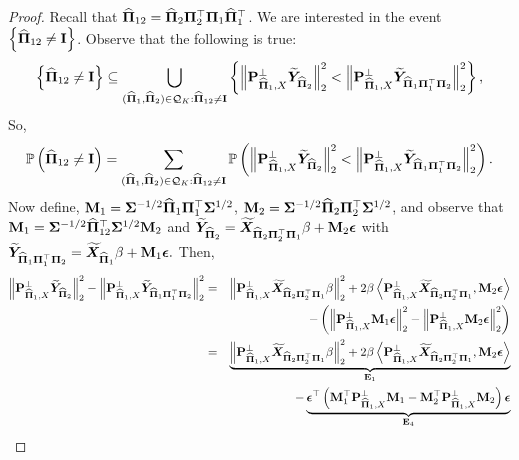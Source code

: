 \documentclass[numsec,webpdf,modern,medium,namedate]{oup-authoring-template}
\theoremstyle{thmstyleone}%
\theoremstyle{thmstyletwo}%
\theoremstyle{thmstylethree}%
\begin{document}
\begin{proof}
Recall that $\hatPi_{12} = \hatPi_2 \bPi_2^\top \bPi_1 \hatPi_1^\top$. We are interested in the event $\left\{\hatPi_{12} \ne \bI\right\}$. Observe that the following is true:
\begin{equation}
\label{eq:selection}
\left\{\hatPi_{12} \ne \bI\right\} \subseteq \underset{(\hatPi_1, \hatPi_2) \in \calQ_K:\hatPi_{12}\neq \bI}{\bigcup}\left\{\left\| \bP_{\hatPi_1, X}^\perp \widetilde{\bY}_{{\hatPi_2}}\right\|_2^2 
<
\left\| \bP_{\hatPi_1, X}^\perp \tilY_{\hatPi_1 \bPi_1^\top \bPi_2} \right\|_2^2\right\},
\end{equation}
So, $$\Prob\left(\hatPi_{12} \ne \bI\right) = \sum_{(\hatPi_1, \hatPi_2) \in \calQ_K:\hatPi_{12}\neq \bI} \Prob\left(\left\| \bP_{\hatPi_1, X}^\perp \tilY_{{\hatPi_2}}\right\|_2^2 
< \left\| \bP_{\hatPi_1, X}^\perp \tilY_{\hatPi_1 \bPi_1^\top \bPi_2} \right\|_2^2\right).$$
Now define, $\bM_1 = \bSigma^{-1/2}\hatPi_1 \bPi_1^\top \bSigma^{1/2}$,  $\bM_2 = \bSigma^{-1/2}\hatPi_2 \bPi_2^\top \bSigma^{1/2}$, and observe that $\bM_1 =\bSigma^{-1/2} \hatPi_{12}^\top \bSigma^{1/2} \bM_2$ and $\tilY_{\hatPi_2} = \tilX_{\hatPi_2\bPi_2^\top \bPi_1} \beta + \bM_2 \beps$ with $\tilY_{\hatPi_1 \bPi_1^\top \bPi_2} = \tilX_{\hatPi_1} \beta + \bM_1 \beps.$
Then, 
{\footnotesize
\begin{eqnarray*}
\left\| \bP_{\hatPi_1, X}^\perp \tilY_{\hatPi_2}\right\|_2^2 -
\left\| \bP_{\hatPi_1, X}^\perp \tilY_{\hatPi_1 \bPi_1^\top \bPi_2} \right\|_2^2 & = &\norm{\bP_{\hatPi_1, X}^\perp \tilX_{\hatPi_2\bPi_2^\top \bPi_1} \beta}_2^2 + 2 \beta \left\langle \bP_{\hatPi_1, X}^\perp \tilX_{\hatPi_2\bPi_2^\top \bPi_1} , \bM_2 \beps\right\rangle \\
&& -\left(\norm{ \bP_{\hatPi_1, X}^\perp \bM_1 \beps}_2^2 - \norm{ \bP_{\hatPi_1, X}^\perp \bM_2 \beps}_2^2\right) \\
& = &\underbrace{\norm{\bP_{\hatPi_1, X}^\perp \tilX_{\hatPi_2\bPi_2^\top \bPi_1} \beta}_2^2 + 2 \beta \left\langle \bP_{\hatPi_1, X}^\perp \tilX_{\hatPi_2\bPi_2^\top \bPi_1} , \bM_2 \beps\right\rangle}_{\bE_1} \\
&& - \underbrace{\beps^\top \left(\bM_1^\top \bP_{\hatPi_1, X}^\perp  \bM_1 - \bM_2^\top \bP_{\hatPi_1, X}^\perp  \bM_2\right)\beps}_{\bE_4} 
\end{eqnarray*}}


\end{proof}
\end{document}
